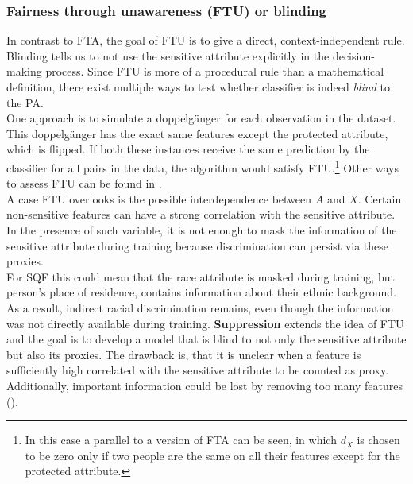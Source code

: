 \subsubsection*{Fairness through unawareness (FTU) or blinding}
In contrast to FTA, the goal of FTU is to give a direct, context-independent rule. Blinding tells us to not use the sensitive attribute explicitly in the decision-making process.
Since FTU is more of a procedural rule than a mathematical definition, there exist multiple ways to test whether classifier is indeed \textit{blind} to the PA. \\
One approach is to simulate a doppelgänger for each observation in the dataset. This doppelgänger has the exact same features except the protected attribute, which is flipped.
If both these instances receive the same prediction by the classifier for all pairs in the data, the algorithm would satisfy FTU.\footnote{In this case a parallel to a version of FTA can be seen, in which $d_X$ is chosen to be zero only if two people are the same on all their features except for the protected attribute.} Other ways to assess FTU can be found in \cite{verma2018}.\\
A case FTU overlooks is the possible interdependence between $A$ and $X$. Certain non-sensitive features can have a strong correlation with the sensitive attribute. In the presence of such variable, it is not enough to mask the information of the sensitive attribute during training because discrimination can persist via these proxies.\\
For SQF this could mean that the race attribute is masked during training, but person's place of residence, contains information about their ethnic background. As a result, indirect racial discrimination remains, even though the information was not directly available during training.
\textbf{Suppression} extends the idea of FTU and the goal is to develop a model that is blind to not only the sensitive attribute but also its proxies. The drawback is, that it is unclear when a feature is sufficiently high correlated with the sensitive attribute to be counted as proxy. Additionally, important information could be lost by removing too many features (\cite{castelnovo2022}).


